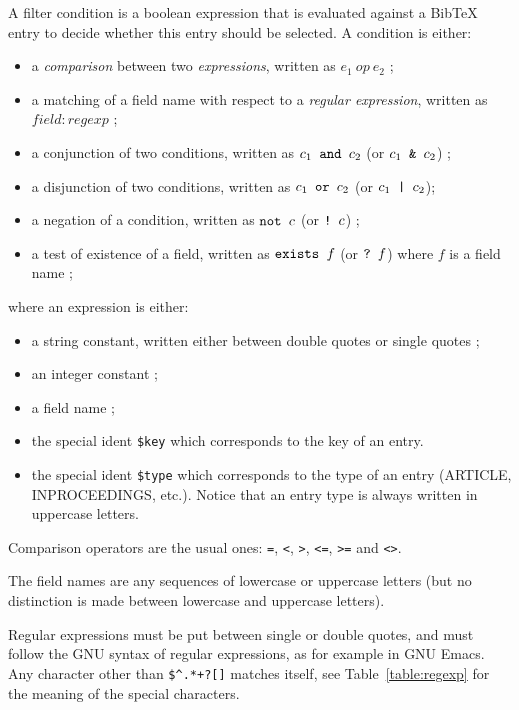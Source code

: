\documentclass[11pt,a4paper]{article}
\begin{document}
A filter condition is a boolean expression that is evaluated against a
BibTeX entry to decide whether this entry should be selected. A
condition is either:
\begin{itemize}
\item a \emph{comparison} between two \emph{expressions}, written as
  $e_1~op~e_2$ ; 
\item a matching of a field name with respect to a \emph{regular
    expression}, written as $field : regexp$ ; 
\item a conjunction of two conditions, written as $c_1 \verb| and |
  c_2$ (or $c_1 \verb| & | c_2$) ;
\item a disjunction of two conditions, written as $c_1 \verb| or |
  c_2$ (or $c_1 \verb+ | + c_2$);
\item a negation of a condition, written as $\verb|not | c$ (or
  $\verb|! | c$) ;
\item a test of existence of a field, written as $\verb|exists | f$
  (or $\verb|? | f$) where $f$ is a field name ;
\end{itemize}
where an expression is either:
\begin{itemize}
\item a string constant, written either between double quotes or single 
  quotes ; 
\item an integer constant ;
\item a field name ;
\item the special ident \verb|$key| which corresponds to the key of
  an entry. 
\item the special ident \verb|$type| which corresponds to the type
  of an entry (ARTICLE, INPROCEEDINGS, etc.). Notice that an entry
  type is always written in uppercase letters.
\end{itemize} 

Comparison operators are the usual ones: \texttt{=}, \texttt{<},
\texttt{>}, \texttt{<=}, \texttt{>=} and \texttt{<>}. 

The field names are any sequences of lowercase or uppercase letters (but no
distinction is made between lowercase and uppercase letters).

Regular expressions must be put between single or double quotes, and must
follow the GNU syntax of regular expressions, as for example in GNU Emacs. Any
character other than \verb|$^.*+?[]| matches itself, see
Table~\ref{table:regexp} for the meaning of the special characters.
\end{document}
